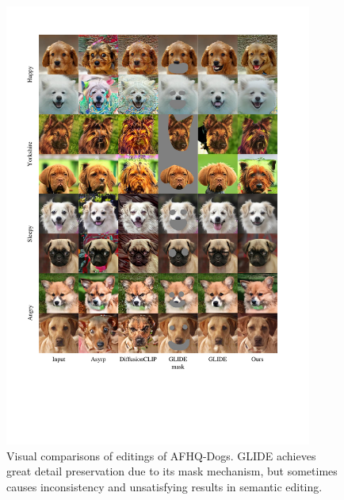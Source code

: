 \documentclass[letterpaper]{article} %
\begin{document}
\begin{figure}[t]
    \centering
    \includegraphics[width=0.9\textwidth]{Figs/fig14.pdf}
    \caption{Visual comparisons of editings of AFHQ-Dogs. GLIDE achieves great detail preservation due to its mask mechanism, but sometimes causes inconsistency and unsatisfying results in semantic editing.}
    \label{fig15}
\end{figure}
\end{document}
